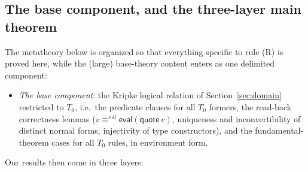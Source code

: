\documentclass{lmcs}
\newcommand{\valeq}{\equiv^{\mathrm{val}}}
\newcommand{\evalop}{\mathsf{eval}}
\newcommand{\quo}{\mathsf{quote}}
\begin{document}
\subsection{The base component, and the three-layer main theorem}
\label{sec:assumptions}

The metatheory below is organized so that everything specific to rule
(R) is proved here, while the (large) base-theory content enters as
one delimited component:

\begin{itemize}
\item[(B)] \emph{The base component}: the Kripke logical relation of
  Section~\ref{sec:domain} restricted to $T_0$, i.e.\ the predicate
  clauses for all $T_0$ formers, the read-back correctness lemmas
  ($v \valeq \evalop(\quo\,v)$, uniqueness and inconvertibility of
  distinct normal forms, injectivity of type constructors), and the
  fundamental-theorem cases for all $T_0$ rules, in environment form.
\end{itemize}

\noindent Our results then come in three layers:
\end{document}
